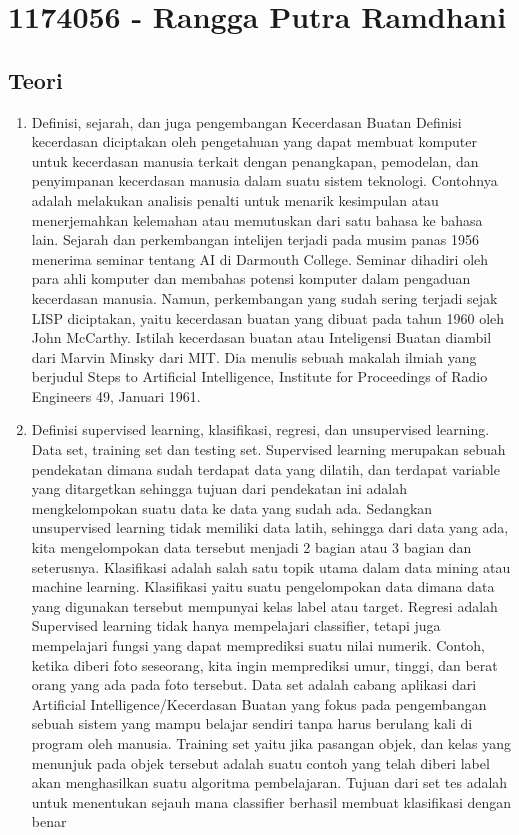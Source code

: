\section{1174056 - Rangga Putra Ramdhani}
\subsection{Teori}
\begin{enumerate}
\item Definisi, sejarah, dan juga pengembangan Kecerdasan Buatan
\subitem Definisi kecerdasan diciptakan oleh pengetahuan yang dapat membuat komputer untuk kecerdasan manusia terkait dengan penangkapan, pemodelan, dan penyimpanan kecerdasan manusia dalam suatu sistem teknologi. Contohnya adalah melakukan analisis penalti untuk menarik kesimpulan atau menerjemahkan kelemahan atau memutuskan dari satu bahasa ke bahasa lain.
\subitem Sejarah dan perkembangan intelijen terjadi pada musim panas 1956 menerima seminar tentang AI di Darmouth College. Seminar dihadiri oleh para ahli komputer dan membahas potensi komputer dalam pengaduan kecerdasan manusia. Namun, perkembangan yang sudah sering terjadi sejak LISP diciptakan, yaitu kecerdasan buatan yang dibuat pada tahun 1960 oleh John McCarthy. Istilah kecerdasan buatan atau Inteligensi Buatan diambil dari Marvin Minsky dari MIT. Dia menulis sebuah makalah ilmiah yang berjudul Steps to Artificial Intelligence, Institute for Proceedings of Radio Engineers 49, Januari 1961. 
\item  Definisi supervised learning, klasifikasi, regresi, dan unsupervised learning. Data set, training set dan testing set. 
\subitem Supervised learning merupakan sebuah pendekatan dimana sudah terdapat data yang dilatih, dan terdapat variable yang ditargetkan sehingga tujuan dari pendekatan ini adalah mengkelompokan suatu data ke data yang sudah ada. Sedangkan unsupervised learning tidak memiliki data latih, sehingga dari data yang ada, kita mengelompokan data tersebut menjadi 2 bagian atau 3 bagian dan seterusnya.
\subitem Klasifikasi adalah salah satu topik utama dalam data mining atau machine learning. Klasifikasi yaitu suatu pengelompokan data dimana data yang digunakan tersebut mempunyai kelas label atau target.
\subitem Regresi adalah Supervised learning tidak hanya mempelajari classifier, tetapi juga mempelajari fungsi yang dapat memprediksi suatu nilai numerik. Contoh, ketika diberi foto seseorang, kita ingin memprediksi umur, tinggi, dan berat orang yang ada pada foto tersebut.
\subitem Data set adalah cabang aplikasi dari Artificial Intelligence/Kecerdasan Buatan yang fokus pada pengembangan sebuah sistem yang mampu belajar sendiri tanpa harus berulang kali di program oleh manusia.
\subitem Training set yaitu jika pasangan objek, dan kelas yang menunjuk pada objek tersebut adalah suatu contoh yang telah diberi label akan menghasilkan suatu algoritma pembelajaran.
\subitem Tujuan dari set tes adalah untuk menentukan sejauh mana classifier berhasil membuat klasifikasi dengan benar
\end{enumerate}
